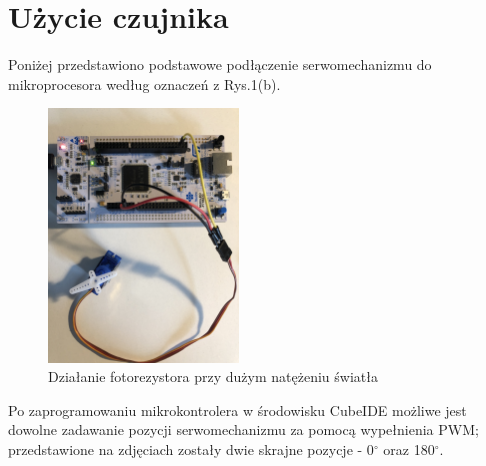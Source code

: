 \documentclass[11pt, a4paper]{article}
\begin{document}
\newpage
\section*{Użycie czujnika}
Poniżej przedstawiono podstawowe podłączenie serwomechanizmu do mikroprocesora według oznaczeń z Rys.1(b).
\vspace{0.5cm}
\begin{figure}[h!]
    \centering
    \includegraphics[width=0.45\textwidth,angle=90,origin=c]{fig/KY-018/polaczenie_modulu/podlaczenie.jpg}
    \caption{Działanie fotorezystora przy dużym natężeniu światła}
    \label{fig:my_label}
\end{figure}

Po zaprogramowaniu mikrokontrolera w środowisku CubeIDE możliwe jest dowolne zadawanie pozycji serwomechanizmu za pomocą wypełnienia PWM; przedstawione na zdjęciach zostały dwie skrajne pozycje - 0$^{\circ}$ oraz 180$^{\circ}$.
\end{document}
